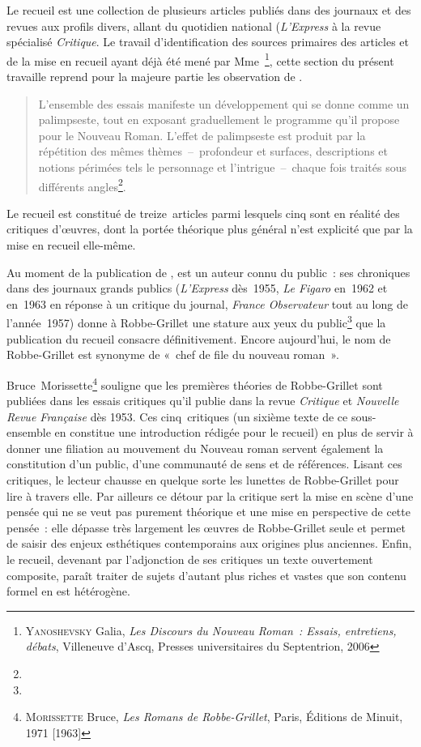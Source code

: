 \documentclass[12pt, a4paper]{article}
\begin{document}
Le recueil \punr est une collection de plusieurs articles publiés dans des journaux et des revues aux profils divers, allant du quotidien national (\textit{L'Express} à la revue spécialisé \textit{Critique}. Le travail d'identification des sources primaires des articles et de la mise en recueil ayant déjà été mené par Mme~\galia\footnote{\textsc{Yanoshevsky} Galia, \textit{Les Discours du Nouveau Roman~: Essais, entretiens, débats}, Villeneuve d'Ascq, Presses universitaires du Septentrion, 2006}, cette section du présent travaille reprend pour la majeure partie les observation de \galia.
\begin{quote}
    L’ensemble des essais manifeste un développement qui se donne comme un palimpseste, tout en exposant graduellement le programme qu’il propose pour le Nouveau Roman. L’effet de palimpseste est produit par la répétition des mêmes thèmes~–~profondeur et surfaces, descriptions et notions périmées tels le personnage et l’intrigue~–~chaque fois traités sous différents angles\footnote{}.
\end{quote}
Le recueil est constitué de treize~articles parmi lesquels cinq sont en réalité des critiques d'œuvres, dont la portée théorique plus général n'est explicité que par la mise en recueil elle-même.

Au moment de la publication de \punr, \robbe{} est un auteur connu du public~: ses chroniques dans des journaux grands publics (\textit{L'Express} dès~1955, \textit{Le Figaro} en~1962 et en~1963 en réponse à un critique du journal, \textit{France Observateur} tout au long de l'année~1957) donne à Robbe-Grillet une stature aux yeux du public\footnote{} que la publication du recueil consacre définitivement. Encore aujourd'hui, le nom de Robbe-Grillet est synonyme de «~chef de file du nouveau roman~».

Bruce~Morissette\footnote{\textsc{Morissette} Bruce, \textit{Les Romans de Robbe-Grillet}, Paris, Éditions de Minuit, 1971 [1963]} souligne que les premières théories de Robbe-Grillet sont publiées dans les essais critiques qu'il publie dans la revue \textit{Critique} et \textit{Nouvelle Revue Française} dès 1953. Ces cinq~critiques (un sixième texte de ce sous-ensemble en constitue une introduction rédigée pour le recueil) en plus de servir à donner une filiation au mouvement du Nouveau roman servent également la constitution d'un public, d'une communauté de sens et de références. Lisant ces critiques, le lecteur chausse en quelque sorte les lunettes de Robbe-Grillet pour lire à travers elle. Par ailleurs ce détour par la critique sert la mise en scène d'une pensée qui ne se veut pas purement théorique et une mise en perspective de cette pensée~: elle dépasse très largement les œuvres de Robbe-Grillet seule et permet de saisir des enjeux esthétiques contemporains aux origines plus anciennes. Enfin, le recueil, devenant par l'adjonction de ses critiques un texte ouvertement composite, paraît traiter de sujets d'autant plus riches et vastes que son contenu formel en est hétérogène.
\end{document}
